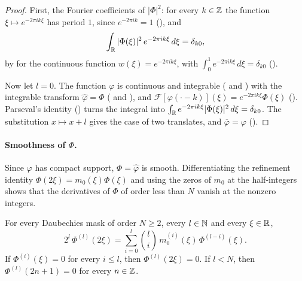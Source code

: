 \begin{proof}
\leanok
{}
First, the Fourier coefficients of $|\Phi|^2$: for every $k \in \mathbb{Z}$ the function
$\xi \mapsto e^{-2\pi i k \xi}$ has period $1$, since $e^{-2\pi i k} = 1$ (),
and
\[
  \int_{\mathbb{R}} |\Phi(\xi)|^2 \, e^{-2\pi i k \xi} \, d\xi = \delta_{k0} ,
\]
by  for the continuous function $w(\xi) = e^{-2\pi i k \xi}$,
with $\int_0^1 e^{-2\pi i k \xi} \, d\xi = \delta_{k0}$ ().

Now let $l = 0$. The function $\varphi$ is continuous and integrable
( and ) with the integrable
transform $\widehat\varphi = \Phi$ ( and
), and
$\mathcal F[\varphi(\cdot - k)](\xi) = e^{-2\pi i k \xi} \Phi(\xi)$
(). Parseval's identity () turns the
integral into $\int_{\mathbb{R}} e^{-2\pi i k \xi} |\Phi(\xi)|^2 \, d\xi = \delta_{k0}$. The substitution
$x \mapsto x + l$ gives the case of two translates, and $\overline{\varphi} = \varphi$
().
\end{proof}

\paragraph{Smoothness of $\Phi$.}
Since $\varphi$ has compact support, $\Phi = \widehat\varphi$ is smooth. Differentiating the
refinement identity $\Phi(2\xi) = m_0(\xi) \Phi(\xi)$ and using the zeros of $m_0$ at the
half-integers shows that the derivatives of $\Phi$ of order less than $N$ vanish at the nonzero
integers.

\begin{lemma}
\label{lem:daub-symbol-product-leibniz}
\leanok
{}
For every Daubechies mask of order $N \geq 2$, every $l \in \mathbb{N}$ and every $\xi \in \mathbb{R}$,
\[
  2^l \, \Phi^{(l)}(2\xi) = \sum_{i=0}^{l} \binom{l}{i} \, m_0^{(i)}(\xi) \, \Phi^{(l-i)}(\xi) .
\]
If $\Phi^{(i)}(\xi) = 0$ for every $i \leq l$, then $\Phi^{(l)}(2\xi) = 0$. If $l < N$, then
$\Phi^{(l)}(2n + 1) = 0$ for every $n \in \mathbb{Z}$.
\end{lemma}

